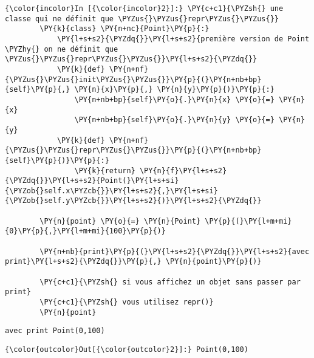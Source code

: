     \begin{Verbatim}[commandchars=\\\{\},frame=single,framerule=0.3mm,rulecolor=\color{cellframecolor}]
{\color{incolor}In [{\color{incolor}2}]:} \PY{c+c1}{\PYZsh{} une classe qui ne définit que \PYZus{}\PYZus{}repr\PYZus{}\PYZus{}}
        \PY{k}{class} \PY{n+nc}{Point}\PY{p}{:}
            \PY{l+s+s2}{\PYZdq{}}\PY{l+s+s2}{première version de Point \PYZhy{} on ne définit que \PYZus{}\PYZus{}repr\PYZus{}\PYZus{}}\PY{l+s+s2}{\PYZdq{}}
            \PY{k}{def} \PY{n+nf}{\PYZus{}\PYZus{}init\PYZus{}\PYZus{}}\PY{p}{(}\PY{n+nb+bp}{self}\PY{p}{,} \PY{n}{x}\PY{p}{,} \PY{n}{y}\PY{p}{)}\PY{p}{:}
                \PY{n+nb+bp}{self}\PY{o}{.}\PY{n}{x} \PY{o}{=} \PY{n}{x}
                \PY{n+nb+bp}{self}\PY{o}{.}\PY{n}{y} \PY{o}{=} \PY{n}{y}
            \PY{k}{def} \PY{n+nf}{\PYZus{}\PYZus{}repr\PYZus{}\PYZus{}}\PY{p}{(}\PY{n+nb+bp}{self}\PY{p}{)}\PY{p}{:}
                \PY{k}{return} \PY{n}{f}\PY{l+s+s2}{\PYZdq{}}\PY{l+s+s2}{Point(}\PY{l+s+si}{\PYZob{}self.x\PYZcb{}}\PY{l+s+s2}{,}\PY{l+s+si}{\PYZob{}self.y\PYZcb{}}\PY{l+s+s2}{)}\PY{l+s+s2}{\PYZdq{}}
            
        \PY{n}{point} \PY{o}{=} \PY{n}{Point} \PY{p}{(}\PY{l+m+mi}{0}\PY{p}{,}\PY{l+m+mi}{100}\PY{p}{)}
        
        \PY{n+nb}{print}\PY{p}{(}\PY{l+s+s2}{\PYZdq{}}\PY{l+s+s2}{avec print}\PY{l+s+s2}{\PYZdq{}}\PY{p}{,} \PY{n}{point}\PY{p}{)}
        
        \PY{c+c1}{\PYZsh{} si vous affichez un objet sans passer par print}
        \PY{c+c1}{\PYZsh{} vous utilisez repr()}
        \PY{n}{point}
\end{Verbatim}


    \begin{Verbatim}[commandchars=\\\{\},frame=single,framerule=0.3mm,rulecolor=\color{cellframecolor}]
avec print Point(0,100)
\end{Verbatim}

\begin{Verbatim}[commandchars=\\\{\},frame=single,framerule=0.3mm,rulecolor=\color{cellframecolor}]
{\color{outcolor}Out[{\color{outcolor}2}]:} Point(0,100)
\end{Verbatim}
            
